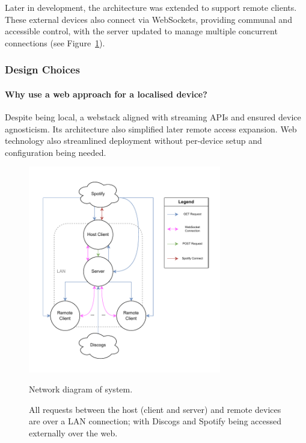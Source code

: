             Later in development, the architecture was extended to support remote clients. These external devices also connect via WebSockets, providing communal and accessible control, with the server updated to manage multiple concurrent connections (see Figure~\ref{fig:networkDiagram}).
        
            \subsubsection{Design Choices}
    
                \paragraph{Why use a web approach for a localised device?} Despite being local, a webstack aligned with streaming APIs and ensured device agnosticism. Its architecture also simplified later remote access expansion. Web technology also streamlined deployment without per-device setup and configuration being needed.
    
                \begin{figure}[h]
                    \centering
                    \includegraphics[width=0.75\textwidth]{images/VTT_network.NetworkDiagram.pdf}
                    \caption{Network diagram of system.}
                    \label{fig:networkDiagram}
                    \caption*{All requests between the host (client and server) and remote devices are over a LAN connection; with Discogs and Spotify being accessed externally over the web.}
                \end{figure}
        
